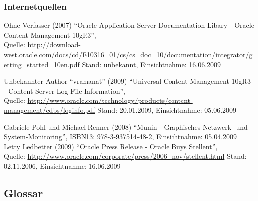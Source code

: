 \documentclass[12pt, a4paper, headsepline]{article}
\begin{document}
\subsubsection{Internetquellen}
\begin{thebibliography}{xxxxxxxx}
	 
	  Ohne Verfasser (2007) "`Oracle Application Server Documentation Libary - Oracle Content Management 10gR3"', \\ Quelle: \url{http://download-west.oracle.com/docs/cd/E10316_01/cs/cs_doc_10/documentation/integrator/getting_started_10en.pdf} \newline Stand: unbekannt, Einsichtnahme: 16.06.2009
	 
	 	  Unbekannter Author "`vramanat"' (2009) "`Universal Content Management 10gR3 - Content Server Log File Information"', \\ Quelle: \url{http://www.oracle.com/technology/products/content-management/cdbs/loginfo.pdf} \newline Stand: 20.01.2009, Einsichtnahme: 05.06.2009
	 	 
	  Gabriele Pohl und Michael Renner (2008) 
	 "`Munin - Graphisches Netzwerk- und System-Monitoring"', \newline ISBN13: 978-3-937514-48-2, Einsichtnahme: 05.04.2009\\	 	 
	 	 
	 	  Letty Ledbetter (2009) "`Oracle Press Release - Oracle Buys Stellent"', \\ Quelle: \url{http://www.oracle.com/corporate/press/2006_nov/stellent.html} \newline Stand: 02.11.2006, Einsichtnahme: 16.06.2009
\end{thebibliography}

\newpage
\subsection{Glossar}
\renewcommand{\glossaryname}{}
\makeglossaries
\printglossaries
\end{document}
